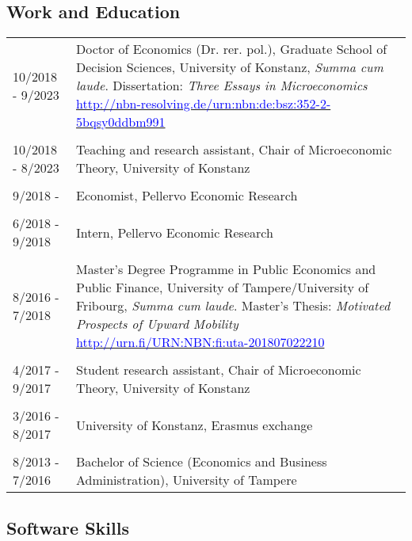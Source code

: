 \documentclass[16pt]{article}
\begin{document}
\subsection*{Work and Education}
\begin{tabular}{@{}p{1.5in}p{5in}}
10/2018 - 9/2023  & Doctor of Economics (Dr. rer. pol.), Graduate School of Decision Sciences, University of Konstanz, \textit{Summa cum laude}. Dissertation: \textit{Three Essays in Microeconomics} \href{http://nbn-resolving.de/urn:nbn:de:bsz:352-2-5bqsy0ddbm991}{\textcolor{blue}{http://nbn-resolving.de/urn:nbn:de:bsz:352-2-5bqsy0ddbm991}} \\

\\
10/2018 - 8/2023  & Teaching and research assistant, Chair of Microeconomic Theory,  University of Konstanz \\

                                                 
\\
9/2018 -            & Economist, Pellervo Economic Research\\

\\
6/2018 - 9/2018 & Intern, Pellervo Economic Research\\

\\
8/2016 - 7/2018 & Master's Degree Programme in Public Economics and Public Finance, University of Tampere/University of Fribourg, \textit{Summa cum laude}. Master's Thesis: \textit{Motivated Prospects of Upward Mobility} \href{http://urn.fi/URN:NBN:fi:uta-201807022210}{\textcolor{blue}{http://urn.fi/URN:NBN:fi:uta-201807022210}}\\

\\
4/2017 - 9/2017 & Student research assistant, Chair of Microeconomic Theory,  University of Konstanz\\

\\
3/2016 - 8/2017 & University of Konstanz, Erasmus exchange \\
\\
8/2013 - 7/2016 & Bachelor of Science (Economics and Business Administration), University of Tampere\\
                           
\end{tabular}

\subsection*{Software Skills}
\end{document}
